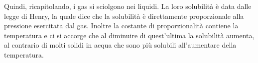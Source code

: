 \vspace{0.2cm}Quindi, ricapitolando, i gas si sciolgono nei liquidi. La loro solubilità è data dalle legge di Henry, la quale dice che la solubilità è direttamente proporzionale alla pressione esercitata dal gas. Inoltre la costante di proporzionalità contiene la temperatura e ci si accorge che al diminuire di quest'ultima la solubilità aumenta, al contrario di molti solidi in acqua che sono più solubili all'aumentare della temperatura.